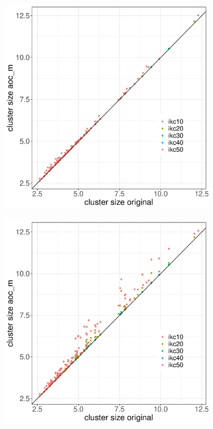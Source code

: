 \documentclass[12pt, oneside]{article}   	%
\begin{document}
\begin{figure}[H]
\centering
\begin{subfigure}[t]{0.48\textwidth}
\centering
\includegraphics[width=\linewidth]{bl_fig1a.pdf} 
\end{subfigure}
\hfill
\begin{subfigure}[t]{0.48\textwidth}
\centering
\includegraphics[width=\linewidth]{bl_fig1b.pdf} 

\end{subfigure}
\end{figure}
\end{document}
